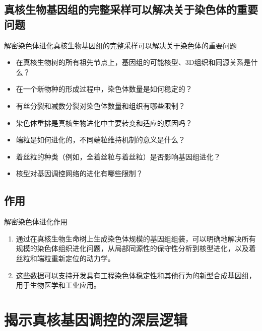 \documentclass{beamer}
\begin{document}
	\subsection*{真核生物基因组的完整采样可以解决关于染色体的重要问题}
	\begin{frame}{解密染色体进化}{真核生物基因组的完整采样可以解决关于染色体的重要问题}
		\begin{itemize}
			\item 在真核生物树的所有祖先节点上，基因组的可能核型、3D组织和同源关系是什么？
			\item 在一个新物种的形成过程中，染色体数量是如何稳定的？
			\item 有丝分裂和减数分裂对染色体数量和组织有哪些限制？
			\item 染色体重排是真核生物进化中主要转变和适应的原因吗？
			\item 端粒是如何进化的，不同端粒维持机制的意义是什么？
			\item 着丝粒的种类（例如，全着丝粒与着丝粒）是否影响基因组进化？
			\item 核型对基因调控网络的进化有哪些限制？
			
		\end{itemize}
	\end{frame}

	

	\subsection*{作用}
	\begin{frame}{解密染色体进化}{作用}
		\begin{enumerate}
			\item 通过在真核生物生命树上生成染色体规模的基因组组装，可以明确地解决所有规模的染色体组织进化问题，从局部同源性的保守性分析到核型进化，以及着丝粒和端粒重新定位的动力学。
			\item 这些数据可以支持开发具有工程染色体稳定性和其他行为的新型合成基因组，用于生物医学和工业应用。
		\end{enumerate}
	\end{frame}


	\section{揭示真核基因调控的深层逻辑}
\end{document}
